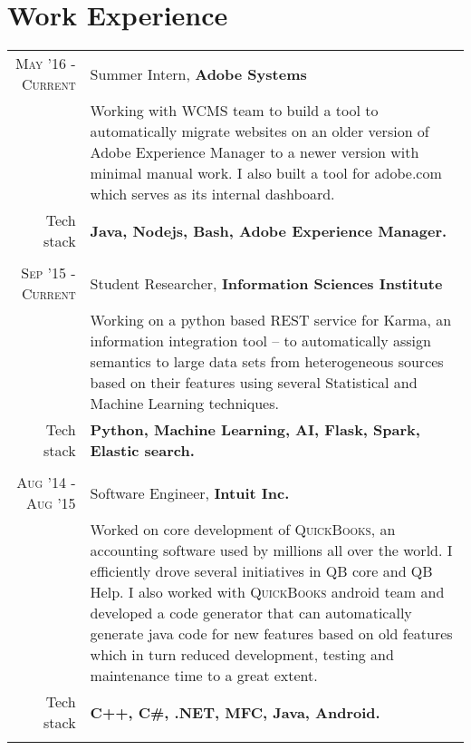 \section{Work Experience}
\renewcommand{\arraystretch}{0.85}%
\begin{tabular}{r|p{13cm}}
\textsc{May '16 - Current} & Summer Intern, \textbf{Adobe Systems} \\
& \small{Working with WCMS team to build a tool to automatically migrate websites on an older version of Adobe Experience Manager to a newer version with minimal manual work. I also built a tool for adobe.com which serves as its internal dashboard.}\\
\small{Tech stack} &\footnotesize{\textbf{Java, Nodejs, Bash, Adobe Experience Manager.}} \\
\multicolumn{2}{c}{} \\

\textsc{Sep '15 - Current} & Student Researcher, \textbf{Information Sciences Institute} \\
& \small{Working on a python based REST service for Karma, an information integration tool – to automatically assign semantics to large data sets from heterogeneous sources based on their features using several Statistical and Machine Learning techniques.}\\
\small{Tech stack} &\footnotesize{\textbf{Python, Machine Learning, AI, Flask, Spark, Elastic search.}} \\
\multicolumn{2}{c}{} \\

\textsc{Aug '14 - Aug '15 } & Software Engineer, \textbf{Intuit Inc.} \\
& \small{Worked on core development of \textsc{QuickBooks}, an accounting software used by millions all over the world. I efficiently drove several initiatives in QB core and QB Help. I also worked with \textsc{QuickBooks} android team and developed a code generator that can automatically generate java code for new features based on old features which in turn reduced development, testing and maintenance time to a great extent.}\\
\small{Tech stack} &\footnotesize{\textbf{C++, C\#, .NET, MFC, Java, Android.}} \\
\multicolumn{2}{c}{}



\end{tabular}
